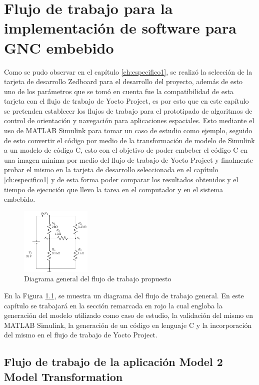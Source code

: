 \chapter{Flujo de trabajo para la implementación de software para GNC embebido}
\label{ch:especifico2}

Como se pudo observar en el capítulo \ref{ch:especifico1}, se realizó la selección de la tarjeta de desarrollo Zedboard para el desarrollo del proyecto, además de esto uno de los parámetros que se tomó en cuenta fue la compatibilidad de esta tarjeta con el flujo de trabajo de Yocto Project, es por esto que en este capítulo se pretenden establecer los flujos de trabajo para el prototipado de algoritmos de control de orientación y navegación para aplicaciones espaciales. Esto mediante el uso de MATLAB Simulink para tomar un caso de estudio como ejemplo, seguido de esto convertir el código por medio de la transformación de modelo de Simulink a un modelo de código C, esto con el objetivo de poder embeber el código C en una imagen mínima por medio del flujo de trabajo de Yocto Project y finalmente probar el mismo en la tarjeta de desarrollo seleccionada en el capítulo \ref{ch:especifico1} y de esta forma poder comparar los resultados obtenidos y el tiempo de ejecución que llevo la tarea en el computador y en el sistema embebido.


\begin{figure}[h!]
    \centering
    \includegraphics[width=0.3\textwidth]{fig/figtemplate.pdf}
    \caption{Diagrama general del flujo de trabajo propuesto}
    \label{fig:diagrama_flujo_trabajo}
\end{figure}


En la Figura \ref{fig:diagrama_flujo_trabajo}, se muestra un diagrama del flujo de trabajo general. En este capítulo se trabajará en la sección remarcada en rojo la cual engloba la generación del modelo utilizado como caso de estudio, la validación del mismo en MATLAB Simulink, la generación de un código en lenguaje C y la incorporación del mismo en el flujo de trabajo de Yocto Project.

\section{Flujo de trabajo de la aplicación Model 2 Model Transformation}

